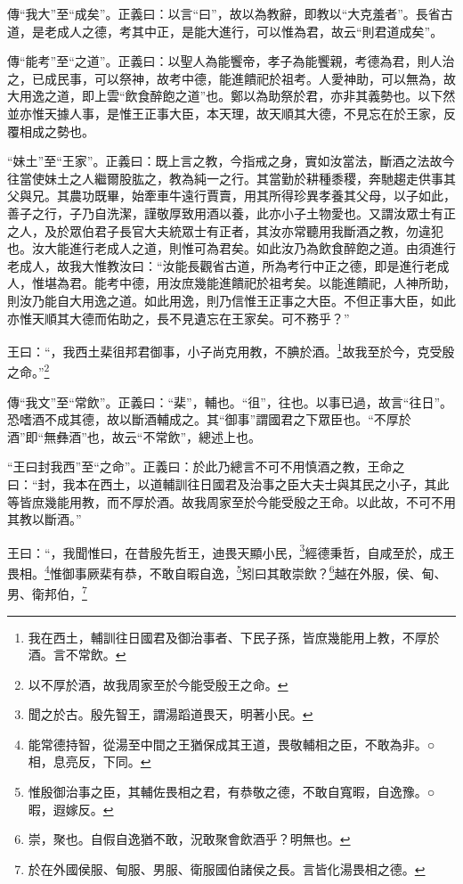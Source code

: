 {\noindent\zhuan{}\fzbyks 傳“我大”至“成矣”。正義曰：以言“曰”，故以為教辭，即教以“大克羞者”。長省古道，是老成人之德，考其中正，是能大進行，可以惟為君，故云“則君道成矣”。 \par}

{\noindent\zhuan{}\fzbyks 傳“能考”至“之道”。正義曰：以聖人為能饗帝，孝子為能饗親，考德為君，則人治之，已成民事，可以祭神，故考中德，能進饋祀於祖考。人愛神助，可以無為，故大用逸之道，即上雲“飲食醉飽之道”也。鄭以為助祭於君，亦非其義勢也。以下然並亦惟天據人事，是惟王正事大臣，本天理，故天順其大德，不見忘在於王家，反覆相成之勢也。 \par}

{\noindent\shu{}\fzkt “妹土”至“王家”。正義曰：既上言之教，今指戒之身，實如汝當法，斷酒之法故今往當使妹土之人繼爾股肱之，教為純一之行。其當勤於耕種黍稷，奔馳趨走供事其父與兄。其農功既畢，始牽車牛遠行賈賣，用其所得珍異孝養其父母，以子如此，善子之行，子乃自洗潔，謹敬厚致用酒以養，此亦小子土物愛也。又謂汝眾士有正之人，及於眾伯君子長官大夫統眾士有正者，其汝亦常聽用我斷酒之教，勿違犯也。汝大能進行老成人之道，則惟可為君矣。如此汝乃為飲食醉飽之道。由須進行老成人，故我大惟教汝曰：“汝能長觀省古道，所為考行中正之德，即是進行老成人，惟堪為君。能考中德，用汝庶幾能進饋祀於祖考矣。以能進饋祀，人神所助，則汝乃能自大用逸之道。如此用逸，則乃信惟王正事之大臣。不但正事大臣，如此亦惟天順其大德而佑助之，長不見遺忘在王家矣。可不務乎？” \par}

王曰：“，我西土棐徂邦君御事，小子尚克用教，不腆於酒。\footnote{我在西土，輔訓往日國君及御治事者、下民子孫，皆庶幾能用上教，不厚於酒。言不常飲。}故我至於今，克受殷之命。”\footnote{以不厚於酒，故我周家至於今能受殷王之命。}


{\noindent\zhuan{}\fzbyks 傳“我文”至“常飲”。正義曰：“棐”，輔也。“徂”，往也。以事已過，故言“往日”。恐嗜酒不成其德，故以斷酒輔成之。其“御事”謂國君之下眾臣也。“不厚於酒”即“無彝酒”也，故云“不常飲”，總述上也。 \par}

{\noindent\shu{}\fzkt “王曰封我西”至“之命”。正義曰：於此乃總言不可不用慎酒之教，王命之曰：“封，我本在西土，以道輔訓往日國君及治事之臣大夫士與其民之小子，其此等皆庶幾能用教，而不厚於酒。故我周家至於今能受殷之王命。以此故，不可不用其教以斷酒。” \par}

王曰：“，我聞惟曰，在昔殷先哲王，迪畏天顯小民，\footnote{聞之於古。殷先智王，謂湯蹈道畏天，明著小民。}經德秉哲，自咸至於，成王畏相。\footnote{能常德持智，從湯至中間之王猶保成其王道，畏敬輔相之臣，不敢為非。○相，息亮反，下同。}惟御事厥棐有恭，不敢自暇自逸，\footnote{惟殷御治事之臣，其輔佐畏相之君，有恭敬之德，不敢自寬暇，自逸豫。○暇，遐嫁反。}矧曰其敢崇飲？\footnote{崇，聚也。自假自逸猶不敢，況敢聚會飲酒乎？明無也。}越在外服，侯、甸、男、衛邦伯，\footnote{於在外國侯服、甸服、男服、衛服國伯諸侯之長。言皆化湯畏相之德。}

